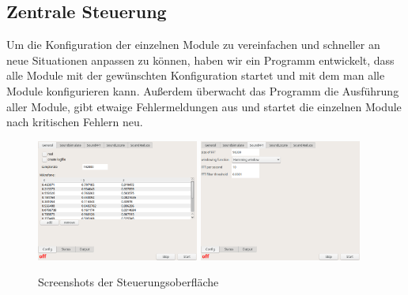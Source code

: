 \subsection{Zentrale Steuerung}
Um die Konfiguration der einzelnen Module zu vereinfachen und schneller an neue Situationen anpassen zu können, haben wir ein Programm entwickelt, dass alle Module mit der gewünschten Konfiguration startet und mit dem man alle Module konfigurieren kann. Außerdem überwacht das Programm die Ausführung aller Module, gibt etwaige Fehlermeldungen aus und startet die einzelnen Module nach kritischen Fehlern neu.
\begin{figure}[H]
    \centering
    \includegraphics[width=0.475\textwidth]{img/GUI}
    \hfill
    \includegraphics[width=0.475\textwidth]{img/GUI2}
    \caption{Screenshots der Steuerungsoberfläche\label{fig:gui_screenshot}}
\end{figure}
\pagebreak
